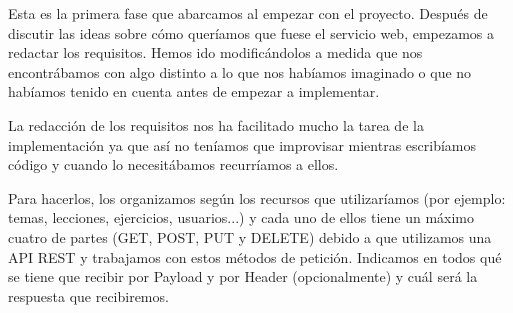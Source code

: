 
Esta es la primera fase que abarcamos al empezar con el proyecto. Después de discutir las ideas sobre cómo queríamos que fuese el servicio web, empezamos a redactar los requisitos. Hemos ido modificándolos a medida que nos encontrábamos con algo distinto a lo que nos habíamos imaginado o que no habíamos tenido en cuenta antes de empezar a implementar.
\vspace{1em}

La redacción de los requisitos nos ha facilitado mucho la tarea de la implementación ya que así no teníamos que improvisar mientras escribíamos código y cuando lo necesitábamos recurríamos a ellos.
\vspace{1em}

Para hacerlos, los organizamos según los recursos que utilizaríamos (por ejemplo: temas, lecciones, ejercicios, usuarios...) y cada uno de ellos tiene un máximo cuatro de partes (GET, POST, PUT y DELETE) debido a que utilizamos una API REST y trabajamos con estos métodos de petición. Indicamos en todos qué se tiene que recibir por Payload y por Header (opcionalmente) y cuál será la respuesta que recibiremos.

